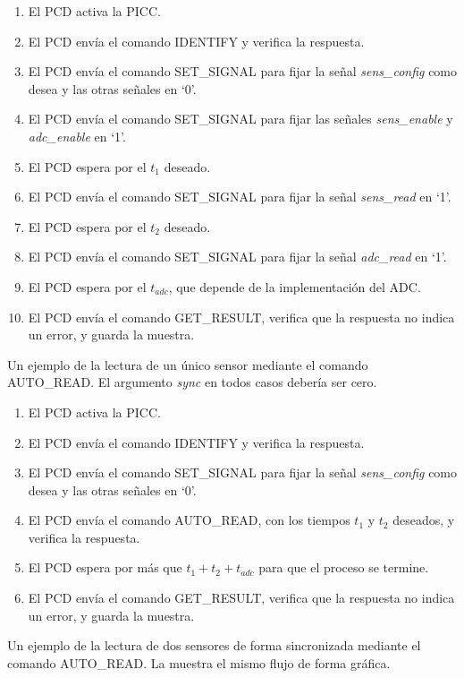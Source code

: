 \documentclass[a4paper, twoside, 11pt]{report}
\begin{document}
\begin{enumerate}
  \item El PCD activa la PICC.
  \item El PCD envía el comando IDENTIFY y verifica la respuesta.
  \item El PCD envía el comando SET\_SIGNAL para fijar la señal \textit{sens\_config} como desea y las otras señales en ‘0’.
  \item El PCD envía el comando SET\_SIGNAL para fijar las señales \textit{sens\_enable} y \textit{adc\_enable} en ‘1’.
  \item El PCD espera por el $t_1$ deseado.
  \item El PCD envía el comando SET\_SIGNAL para fijar la señal \textit{sens\_read} en ‘1’.
  \item El PCD espera por el $t_2$ deseado.
  \item El PCD envía el comando SET\_SIGNAL para fijar la señal \textit{adc\_read} en ‘1’.
  \item El PCD espera por el $t_{adc}$, que depende de la implementación del ADC.
  \item El PCD envía el comando GET\_RESULT, verifica que la respuesta no indica un error, y guarda la muestra.
\end{enumerate}

Un ejemplo de la lectura de un único sensor mediante el comando AUTO\_READ. El argumento \textit{sync} en todos casos debería ser cero.

\begin{enumerate}
  \item El PCD activa la PICC.
  \item El PCD envía el comando IDENTIFY y verifica la respuesta.
  \item El PCD envía el comando SET\_SIGNAL para fijar la señal \textit{sens\_config} como desea y las otras señales en ‘0’.
  \item El PCD envía el comando AUTO\_READ, con los tiempos $t_1$ y $t_2$ deseados, y verifica la respuesta.
  \item El PCD espera por más que $t_1 + t_2 + t_{adc}$ para que el proceso se termine.
  \item El PCD envía el comando GET\_RESULT, verifica que la respuesta no indica un error, y guarda la muestra.
\end{enumerate}

Un ejemplo de la lectura de dos sensores de forma sincronizada mediante el comando AUTO\_READ. La  muestra el mismo flujo de forma gráfica.
\end{document}
